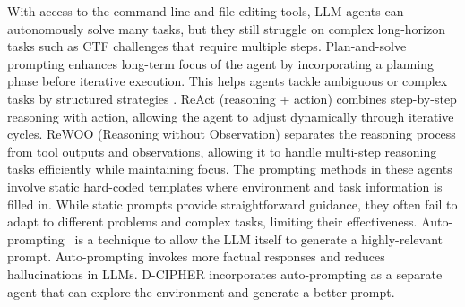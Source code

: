 With access to the command line and file editing tools, LLM agents can autonomously solve many tasks, but they still struggle on complex long-horizon tasks such as CTF challenges that require multiple steps.
Plan-and-solve prompting \cite{wang2023planandsolve} enhances long-term focus of the agent by incorporating a planning phase before iterative execution. This helps agents tackle ambiguous or complex tasks by structured strategies \cite{turtayev2024hacking}.
ReAct (reasoning + action) \cite{yao2022react} combines step-by-step reasoning with action, allowing the agent to adjust dynamically through iterative cycles. ReWOO (Reasoning without Observation) \cite{xu2023rewoo} separates the reasoning process from tool outputs and observations, allowing it to handle multi-step reasoning tasks efficiently while maintaining focus.
The prompting methods in these agents involve static hard-coded templates where environment and task information is filled in.
While static prompts provide straightforward guidance, they often fail to adapt to different problems and complex tasks, limiting their effectiveness.
Auto-prompting~\cite{shin-etal-2020-autoprompt, zhou-etal-2023-revisiting, zhang2023automatic} is a technique to allow the LLM itself to generate a highly-relevant prompt. Auto-prompting invokes more factual responses and reduces hallucinations in LLMs.
D-CIPHER incorporates auto-prompting as a separate agent that can explore the environment and generate a better prompt.



